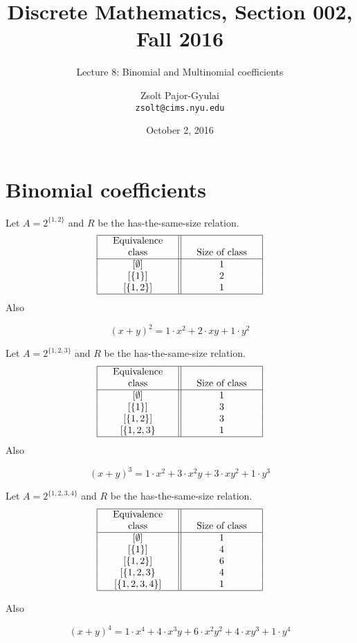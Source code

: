 \documentclass{beamer}
\title{Discrete Mathematics, Section 002, Fall 2016}
\subtitle{Lecture 8: Binomial and Multinomial coefficients}
\author[Zsolt]{Zsolt Pajor-Gyulai \\ \texttt{zsolt@cims.nyu.edu}}
\date{October 2, 2016}
\institute[NYU] 
{
\normalsize Courant Institute of Mathematical Sciences
}
\def\bl[#1]#2{\begin{block}{#1}#2\end{block}}
\begin{document}
\begin{frame}
  \titlepage
\end{frame}


\section{Binomial coefficients}

\begin{frame}
Let $A=2^{\{1,2\}}$ and $R$ be the has-the-same-size relation.
\[
\begin{tabular}{| >{\centering\arraybackslash}b{1in}|| >{\centering\arraybackslash}b{1in}|}
\hline
\textrm{Equivalence class}& \textrm{Size of class}\\
\hline
$[\emptyset]$ & 1\\
$[\{1\}]$& 2\\
$[\{1,2\}]$& 1\\
\hline
\end{tabular}
\]
Also 
\bl[]{
\[
(x+y)^2=1\cdot x^2+2\cdot xy+1\cdot y^2
\]}
\end{frame}

\begin{frame}
Let $A=2^{\{1,2,3\}}$ and $R$ be the has-the-same-size relation.
\[
\begin{tabular}{| >{\centering\arraybackslash}b{1in}|| >{\centering\arraybackslash}b{1in}|}
\hline
\textrm{Equivalence class}& \textrm{Size of class}\\
\hline
$[\emptyset]$ & 1\\
$[\{1\}]$& 3\\
$[\{1,2\}]$& 3\\
$[\{1,2,3\}$& 1\\
\hline
\end{tabular}
\]
Also 
\bl[]{
\[
(x+y)^3=1\cdot x^2+3\cdot x^2y+3\cdot xy^2+1\cdot y^3
\]}

\end{frame}

\begin{frame}
Let $A=2^{\{1,2,3,4\}}$ and $R$ be the has-the-same-size relation.
\[
\begin{tabular}{| >{\centering\arraybackslash}b{1in}|| >{\centering\arraybackslash}b{1in}|}
\hline
\textrm{Equivalence class}& \textrm{Size of class}\\
\hline
$[\emptyset]$ & 1\\
$[\{1\}]$& 4\\
$[\{1,2\}]$& 6\\
$[\{1,2,3\}$& 4\\
$[\{1,2,3,4\}]$& 1\\
\hline
\end{tabular}
\]

Also 
\bl[]{
\[
(x+y)^4=1\cdot x^4+4\cdot x^3y+6\cdot x^2y^2+4\cdot xy^3+1\cdot y^4
\]}
\end{frame}
\end{document}
